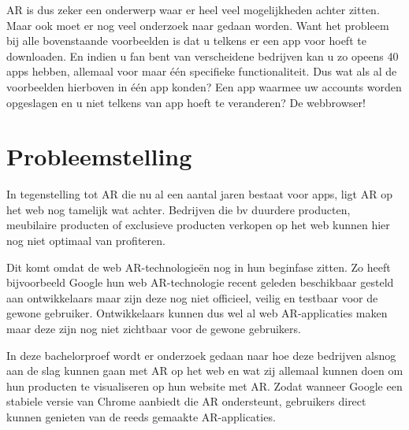 AR is dus zeker een onderwerp waar er heel veel mogelijkheden achter zitten. Maar ook moet er nog veel onderzoek naar gedaan worden. Want het probleem bij alle bovenstaande voorbeelden is dat u telkens er een app voor hoeft te downloaden. En indien u fan bent van verscheidene bedrijven kan u zo opeens 40 apps hebben, allemaal voor maar één specifieke functionaliteit. Dus wat als al de voorbeelden hierboven in één app konden? Een app waarmee uw accounts worden opgeslagen en u niet telkens van app hoeft te veranderen? De webbrowser! 


\section{Probleemstelling}
\label{sec:probleemstelling}

In tegenstelling tot AR die nu al een aantal jaren bestaat voor apps, ligt AR op het web nog tamelijk wat achter. Bedrijven die bv duurdere producten, meubilaire producten of exclusieve producten verkopen op het web kunnen hier nog niet optimaal van profiteren. 

Dit komt omdat de web AR-technologieën nog in hun beginfase zitten. Zo heeft bijvoorbeeld Google hun web AR-technologie recent geleden beschikbaar gesteld aan ontwikkelaars maar zijn deze nog niet officieel, veilig en testbaar voor de gewone gebruiker. Ontwikkelaars kunnen dus wel al web AR-applicaties maken maar deze zijn nog niet zichtbaar voor de gewone gebruikers. 

In deze bachelorproef wordt er onderzoek gedaan naar hoe deze bedrijven alsnog aan de slag kunnen gaan met AR op het web en wat zij allemaal kunnen doen om hun producten te visualiseren op hun website met AR. Zodat wanneer Google een stabiele versie van Chrome aanbiedt die AR ondersteunt, gebruikers direct kunnen genieten van de reeds gemaakte AR-applicaties.

